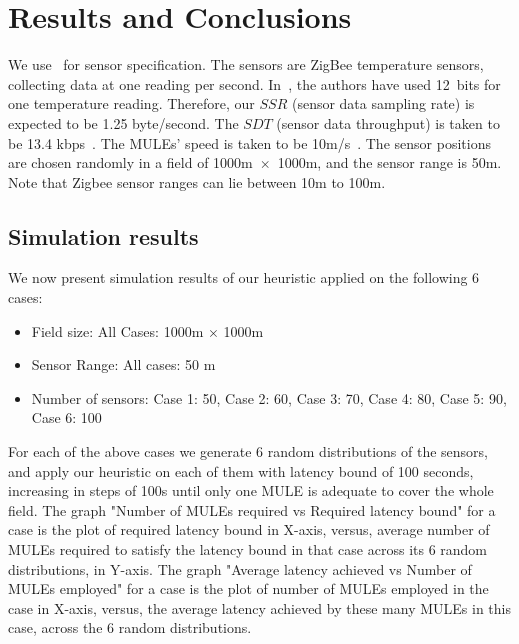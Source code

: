 \chapter{Results and Conclusions}\label{chapter:5}


We use~\cite{terada} for sensor specification. The sensors are ZigBee temperature sensors, collecting data at one reading per second. In~\cite{terada}, the authors have used 12~bits for one temperature reading. Therefore, our $SSR$ (sensor data sampling rate) is expected to be 1.25 byte/second. The $SDT$ (sensor data throughput) is taken to be 13.4 kbps~\cite{zigbee}. The MULEs' speed is taken to be 10m/s~\cite{muleSpeed}. The sensor positions are chosen randomly in a field of 1000m~$\times$~1000m, and the sensor range is 50m. Note that Zigbee sensor ranges can lie between 10m to 100m.

\section{Simulation results}
We now present simulation results of our heuristic applied on the following 6 cases:
\begin{itemize}
\item Field size: All Cases: 1000m $\times$ 1000m
\item Sensor Range: All cases: 50 m
\item Number of sensors: Case 1: 50, Case 2: 60, Case 3: 70, Case 4: 80, Case 5: 90, Case 6: 100
\end{itemize}

For each of the above cases we generate 6 random distributions of the sensors, and apply our heuristic on each of them with latency bound of 100 seconds, increasing in steps of 100s until only one MULE is adequate to cover the whole field. The graph "Number of MULEs required vs Required latency bound" for a case is the plot of required latency bound in X-axis, versus, average number of MULEs required to satisfy the latency bound in that case across its 6 random distributions, in Y-axis. The graph "Average latency achieved vs Number of MULEs employed" for a case is the plot of number of MULEs employed in the case in X-axis, versus, the average latency achieved by these many MULEs in this case, across the 6 random distributions.

